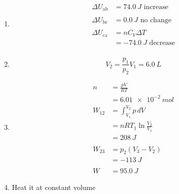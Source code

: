 \documentclass{article}
\begin{document}
\begin{enumerate}
  \item

        \begin{align*}
          \Delta U_\text{ab} & = \qty{74.0}{J} \text{ increase}  \\ \\
          \Delta U_\text{bc} & = \qty{0.0}{J} \text{ no change}  \\ \\
          \Delta U_\text{ca} & = n C_V \Delta T                  \\
                             & = \qty{-74.0}{J} \text{ decrease}
        \end{align*}
\end{enumerate}

\setcounter{subsubsection}{46}
\subsubsection{}

\begin{enumerate}
  \setcounter{enumi}{1}
  \item \[V_2 = \frac{p_1}{p_2} V_1 = \qty{6.0}{L}\]

  \item

        \begin{align*}
          n           & = \frac{p V}{R T}             \\
                      & = \qty{6.01e-2}{mol}          \\
          W_\text{12} & = \int_{V_1}^{V_2} p \,d V    \\
                      & = n R T_1 \ln \frac{V_2}{V_1} \\
                      & = \qty{208}{J}                \\ \\
          W_\text{23} & = p_2 (V_3 - V_2)             \\
                      & = \qty{-113}{J}               \\ \\
          W           & = \qty{95.0}{J}
        \end{align*}

  \item Heat it at constant volume
\end{enumerate}

\setcounter{subsubsection}{48}
\subsubsection{}
\end{document}
